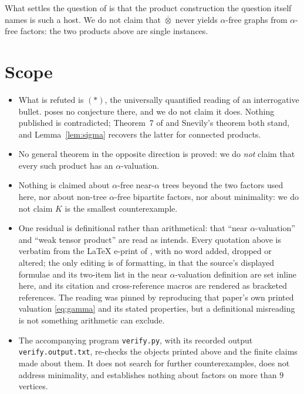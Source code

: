 \documentclass[11pt]{amsart}
\theoremstyle{definition}
\theoremstyle{remark}
\newcommand{\wtp}{\mathbin{\overline{\otimes}}}
\begin{document}
What settles the question of \cite{AHM} is that the product construction the
question itself names is such a host. We do not claim that $\wtp$ never yields
$\alpha$-free graphs from $\alpha$-free factors: the two products above are
single instances.

\section{Scope}\label{sec:scope}

\begin{itemize}
\item What is refuted is $(\ast)$, the universally quantified reading of an
interrogative bullet. \cite{AHM} poses no conjecture there, and we
do not claim it does. Nothing published is contradicted; Theorem~7 of
\cite{EKV} and Snevily's theorem both stand, and Lemma~\ref{lem:sigma}
recovers the latter for connected products.
\item No general theorem in the opposite direction is proved: we do \emph{not}
claim that every such product has an $\alpha$-valuation.
\item Nothing is claimed about $\alpha$-free near-$\alpha$ trees beyond the two
factors used here, nor about non-tree $\alpha$-free bipartite factors, nor about
minimality: we do not claim $K$ is the smallest counterexample.
\item One residual is definitional rather than arithmetical: that ``near
$\alpha$-valuation'' and ``weak tensor product'' are read as \cite{AHM}
intends. Every quotation above is verbatim from the \LaTeX{} e-print of
\cite{AHM}, with no word added, dropped or altered; the only editing is of
formatting, in that the source's displayed formulae and its two-item list in the
near $\alpha$-valuation definition are set inline here, and its citation and
cross-reference macros are rendered as bracketed references. The reading was
pinned by reproducing that paper's own printed valuation \eqref{eq:gamma} and its
stated properties, but a definitional misreading is not something arithmetic can
exclude.
\item The accompanying program \texttt{verify.py}, with its recorded output
\texttt{verify.output.txt}, re-checks the objects printed above and the finite
claims made about them. It does not search for further counterexamples, does not
address minimality, and establishes nothing about factors on more than $9$
vertices.
\end{itemize}
\end{document}
